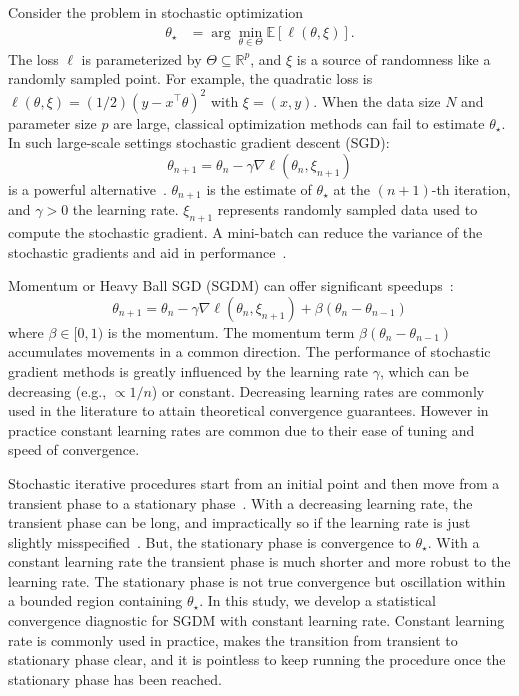 \documentclass[conference]{IEEEtran}
\newcommand{\Ex}[1]{\mathbb{E}[ #1 ]}
\begin{document}
Consider the problem in stochastic optimization
\begin{align}\label{eq:stoch_opt}
\theta_\star &= \arg \min_{\theta \in \Theta} \Ex{ \ell ( \theta, \xi ) }.
\end{align}
The loss $\ell$ is parameterized by $\Theta \subseteq \mathbb{R}^p$, and $\xi$ is a source of randomness like a randomly sampled point.  For example, the quadratic loss is $\ell (\theta, \xi) = (1/2) ( y - x^\top \theta )^2$ with $\xi = (x,y)$. When the data size $N$ and parameter size $p$ are large, classical optimization methods can fail to estimate $\theta_\star$. In such large-scale settings stochastic gradient descent (SGD):
\begin{equation}\label{eq:sgd-vanilla}
\theta_{n+1} = \theta_{n} - \gamma \nabla \ell ( \theta_{n}, \xi_{n+1} )
\end{equation}
is a powerful alternative~\cite{Proc:Bottou_COMPSTAT10, Collect:Bottou_LNCS12, Proc:Zhang_ICML04, Article:Toulis_SAC15}.
$\theta_{n+1}$ is the estimate of $\theta_\star$ at the $(n+1)$-th iteration, and $\gamma > 0$ the learning rate.  $\xi_{n+1}$ represents randomly sampled data used to compute the stochastic gradient.  A mini-batch  can reduce the variance of the stochastic gradients and aid in performance~\cite{Proc:Reddi_NIPS15}.

Momentum or Heavy Ball SGD (SGDM) can offer significant speedups~\cite{Article:Polyak_1964}: 
\begin{equation}\label{eq:sgdm}
\theta_{n+1} = \theta_{n} - \gamma \nabla \ell ( \theta_{n}, \xi_{n+1} ) + \beta ( \theta_{n} - \theta_{n-1} )
\end{equation}
where $\beta \in [0,1)$ is the momentum.
The momentum term $\beta ( \theta_{n} - \theta_{n-1} )$ accumulates movements in a common direction.
The performance of stochastic gradient methods is greatly influenced by the learning rate $\gamma$, which can be decreasing (e.g., $\propto 1/n$) or constant. 
Decreasing learning rates are commonly used in the literature to attain theoretical convergence guarantees.
However in practice constant learning rates are common due to their ease of tuning and speed of convergence.

Stochastic iterative procedures start from an initial point and then move from a transient phase to a stationary phase~\cite{Article:Murata_1998}. 
With a decreasing learning rate, the transient phase can be long, and impractically so if the learning rate is just slightly misspecified~\cite{Article:Nemirovski_SIOPT09, Article:Toulis_AOS17}. 
But, the stationary phase is convergence to $\theta_\star$.  With a constant learning rate the transient phase is much shorter and more robust to the learning rate. 
The stationary phase is not true convergence but oscillation within a bounded region containing $\theta_\star$. In this study, we develop a statistical convergence diagnostic for SGDM with constant learning rate. Constant learning rate is commonly used in practice, makes the transition from transient to stationary phase 
clear, and  it is pointless to keep running the procedure once the stationary phase has been reached. 
\end{document}
